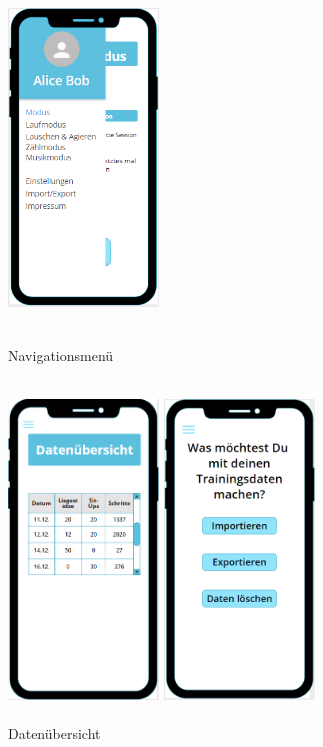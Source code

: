 \documentclass[a4paper,12pt]{article}
\begin{document}
\begin{figure}[ht!]
	\centering
	\begin{minipage}{0.4\textwidth}
		\includegraphics[width=4cm,height=9cm]{./Benutzeroberflaeche/Sidemenu.png}
		\caption{Navigationsmenü}
		\vspace{30px}
	\end{minipage}
	\hfill
	\begin{minipage}{0.4\textwidth}
		\includegraphics[width=4cm,height=9cm]{./Benutzeroberflaeche/Datenuebersicht.png}
		\caption{Datenübersicht}
		\vspace{30px}
	\end{minipage}
	\begin{minipage}{0.4\textwidth}
		\includegraphics[width=4cm,height=9cm]{./Benutzeroberflaeche/Import_Export.png}

\end{minipage}
\end{figure}
\end{document}

